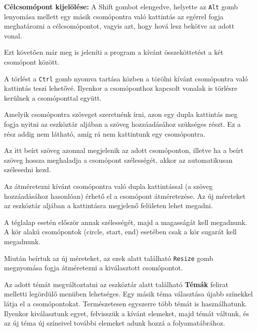 \textbf{Célcsomópont kijelölése:} A Shift gombot elengedve, helyette az \texttt{Alt} gomb lenyomása mellett egy másik csomópontra való kattintás az egérrel fogja meghatározni a célcsomópontot, vagyis azt, hogy hová lesz bekötve az adott vonal.

Ezt követően már meg is jeleníti a program a kívánt összeköttetést a két csomópont között.


A törlést a \texttt{Ctrl} gomb nyomva tartása közben a törölni kívánt csomópontra való kattintás teszi lehetővé. Ilyenkor a csomóponthoz kapcsolt vonalak is törlésre kerülnek a csomóponttal együtt.


Amelyik csomópontra szöveget szeretnénk írni, azon egy dupla kattintás meg fogja nyitni az eszköztár aljában a szöveg hozzáadásához szükséges részt. Ez a rész addig nem látható, amíg rá nem kattintunk egy csomópontra.

Az itt beírt szöveg azonnal megjelenik az adott csomóponton, illetve ha a beírt szöveg hossza meghaladja a csomópont szélességét, akkor az automatikusan szélesedni kezd.


Az átméretezni kívánt csomópontra való dupla kattintással (a szöveg hozzáadásához hasonlóan) érhető el a csomópont átméretezése. Az új méreteket az eszköztár aljában a kattintásra megjelenő felületen lehet megadni.

A téglalap esetén először annak szélességét, majd a magasságát kell megadnunk. A kör alakú csomópontok (circle, start, end) esetében csak a kör sugarát kell megadnunk.

Miután beírtuk az új méreteket, az ezek alatt található \texttt{Resize} gomb megnyomása fogja átméretezni a kiválasztott csomópontot.

Az adott témát megváltoztatni az eszköztár alatt található \textbf{Témák} felirat melletti legördülő menüben lehetséges. Egy másik téma választása újabb színekkel látja el a csomópontokat. Természetesen egyszerre több témát is használhatunk. Ilyenkor kiválasztunk egyet, felvisszük a kívánt elemeket, majd témát váltunk, és az új téma új színeivel további elemeket adunk hozzá a folyamatábrához.


